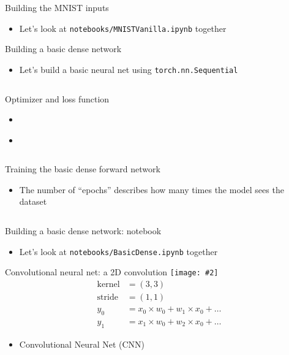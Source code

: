 \documentclass[hyperref={pdfpagelabels=false},12pt]{beamer}
\newcommand{\ig}[2]{\texttt{[image: \#2]}}
\newcommand{\code}[2]{\texttt{#2}}
\newcommand{\python}[1]{\code{python}{#1}}
\newcommand{\namedUrl}[2]{\href{#1}{\color{blue}{#2}}}
\newcommand{\pygment}[3]{\inputminted[bgcolor=lightgray,linenos,fontsize=#1]{#2}{#3}}
\begin{document}
\begin{frame}{Building the MNIST inputs}
  \begin{itemize}
    \item Let's look at \texttt{notebooks/MNISTVanilla.ipynb} together
  \end{itemize}
\end{frame}

\begin{frame}{Building a basic dense network}
  \begin{itemize}
    \item Let's build a basic neural net using \python{torch.nn.Sequential}
  \end{itemize}
  \pygment{\scriptsize}{python}{code/basic-dense-model.py}
\end{frame}

\begin{frame}{Optimizer and loss function}
  \begin{itemize}
    \item \namedUrl{https://arxiv.org/abs/1412.6980}{Adam Optimizer}
    \item \namedUrl{https://pytorch.org/docs/stable/nn.html\#crossentropyloss}{Cross Entropy Loss}
  \end{itemize}
  \pygment{\scriptsize}{python}{code/optimizer-loss-fn.py}
\end{frame}

\begin{frame}{Training the basic dense forward network}
  \begin{itemize}
    \item The number of ``epochs'' describes how many times the model sees the dataset
  \end{itemize}
  \pygment{\scriptsize}{python}{code/training-dense-model.py}
\end{frame}

\begin{frame}{Building a basic dense network: notebook}
  \begin{itemize}
    \item Let's look at \texttt{notebooks/BasicDense.ipynb} together
  \end{itemize}
\end{frame}

\begin{frame}{Convolutional neural net: a 2D convolution}
  \centering
  \ig{0.75}{figures/convolution.png}
  \begin{align*}
    \mathrm{kernel} &= (3, 3) \\
    \mathrm{stride} &= (1, 1) \\
    y_0 &= x_0 \times w_0 + w_1 \times x_0 + \dots \\
    y_1 &= x_1 \times w_0 + w_2 \times x_0 + \dots
  \end{align*}
  \begin{itemize}
    \item Convolutional Neural Net (CNN)
  \end{itemize}
\end{frame}
\end{document}
